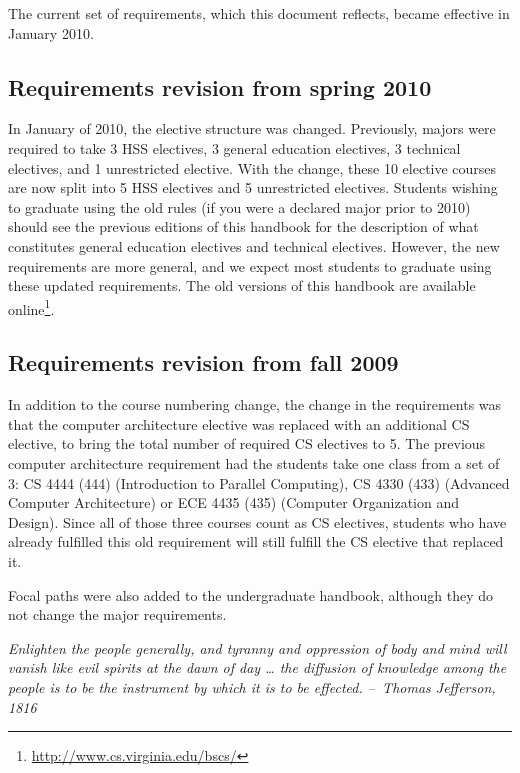 \documentclass[10pt,letter]{book}
\newcommand{\myurl}[1]{\footnote{\scriptsize\url{#1}}}
\begin{document}
The current set of requirements, which this document reflects, became
effective in January 2010.

\subsection{Requirements revision from spring 2010}

In January of 2010, the elective structure was changed. Previously,
majors were required to take 3 HSS electives, 3 general education
electives, 3 technical electives, and 1 unrestricted elective. With
the change, these 10 elective courses are now split into 5 HSS
electives and 5 unrestricted electives. Students wishing to graduate
using the old rules (if you were a declared major prior to 2010)
should see the previous editions of this handbook for the description
of what constitutes general education electives and technical
electives. However, the new requirements are more general, and we
expect most students to graduate using these updated requirements. The
old versions of this handbook are available
online\myurl{http://www.cs.virginia.edu/bscs/}.

\subsection{Requirements revision from fall 2009}

In addition to the course numbering change, the change in the
requirements was that the computer architecture elective was replaced
with an additional CS elective, to bring the total number of required
CS electives to 5. The previous computer architecture requirement had
the students take one class from a set of 3: CS 4444 (444)
(Introduction to Parallel Computing), CS 4330 (433) (Advanced Computer
Architecture) or ECE 4435 (435) (Computer Organization and
Design). Since all of those three courses count as CS electives,
students who have already fulfilled this old requirement will still
fulfill the CS elective that replaced it.

Focal paths were also added to the undergraduate handbook, although
they do not change the major requirements.


\clearpage
\pagestyle{empty}

\vspace*{2in}

\begin{center}
\parbox{2.5in}{{\em Enlighten the people generally, and tyranny and
    oppression of body and mind will vanish like evil spirits at the
    dawn of day … the diffusion of knowledge among the people is to be
    the instrument by which it is to be effected.\linebreak\linebreak
    --~Thomas Jefferson, 1816}}
\end{center}
\end{document}
